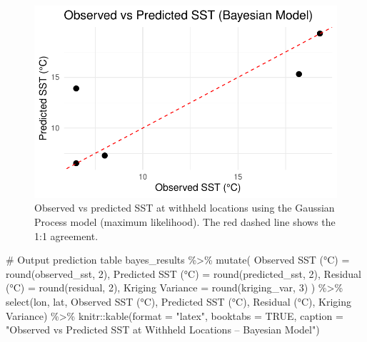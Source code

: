 \documentclass[
  11pt,
]{article}
\newenvironment{Shaded}{\begin{snugshade}}{\end{snugshade}}
\newcommand{\AttributeTok}[1]{\textcolor[rgb]{0.40,0.45,0.13}{#1}}
\newcommand{\CommentTok}[1]{\textcolor[rgb]{0.37,0.37,0.37}{#1}}
\newcommand{\ConstantTok}[1]{\textcolor[rgb]{0.56,0.35,0.01}{#1}}
\newcommand{\DecValTok}[1]{\textcolor[rgb]{0.68,0.00,0.00}{#1}}
\newcommand{\FunctionTok}[1]{\textcolor[rgb]{0.28,0.35,0.67}{#1}}
\newcommand{\NormalTok}[1]{\textcolor[rgb]{0.00,0.23,0.31}{#1}}
\newcommand{\OtherTok}[1]{\textcolor[rgb]{0.00,0.23,0.31}{#1}}
\newcommand{\SpecialCharTok}[1]{\textcolor[rgb]{0.37,0.37,0.37}{#1}}
\newcommand{\StringTok}[1]{\textcolor[rgb]{0.13,0.47,0.30}{#1}}
\begin{document}
\begin{figure}[H]

{\centering \includegraphics{project_files/figure-pdf/fig-bayes_pred_scatter-1.pdf}

}

\caption{Observed vs predicted SST at withheld locations using the
Gaussian Process model (maximum likelihood). The red dashed line shows
the 1:1 agreement.}

\end{figure}%

\begin{Shaded}
\begin{Highlighting}[]
\CommentTok{\# Output prediction table}
\NormalTok{bayes\_results }\SpecialCharTok{\%\textgreater{}\%}
  \FunctionTok{mutate}\NormalTok{(}
    \StringTok{\textasciigrave{}}\AttributeTok{Observed SST (°C)}\StringTok{\textasciigrave{}} \OtherTok{=} \FunctionTok{round}\NormalTok{(observed\_sst, }\DecValTok{2}\NormalTok{),}
    \StringTok{\textasciigrave{}}\AttributeTok{Predicted SST (°C)}\StringTok{\textasciigrave{}} \OtherTok{=} \FunctionTok{round}\NormalTok{(predicted\_sst, }\DecValTok{2}\NormalTok{),}
    \StringTok{\textasciigrave{}}\AttributeTok{Residual (°C)}\StringTok{\textasciigrave{}} \OtherTok{=} \FunctionTok{round}\NormalTok{(residual, }\DecValTok{2}\NormalTok{),}
    \StringTok{\textasciigrave{}}\AttributeTok{Kriging Variance}\StringTok{\textasciigrave{}} \OtherTok{=} \FunctionTok{round}\NormalTok{(kriging\_var, }\DecValTok{3}\NormalTok{)}
\NormalTok{  ) }\SpecialCharTok{\%\textgreater{}\%}
  \FunctionTok{select}\NormalTok{(lon, lat, }\StringTok{\textasciigrave{}}\AttributeTok{Observed SST (°C)}\StringTok{\textasciigrave{}}\NormalTok{, }\StringTok{\textasciigrave{}}\AttributeTok{Predicted SST (°C)}\StringTok{\textasciigrave{}}\NormalTok{, }\StringTok{\textasciigrave{}}\AttributeTok{Residual (°C)}\StringTok{\textasciigrave{}}\NormalTok{, }\StringTok{\textasciigrave{}}\AttributeTok{Kriging Variance}\StringTok{\textasciigrave{}}\NormalTok{) }\SpecialCharTok{\%\textgreater{}\%}
\NormalTok{  knitr}\SpecialCharTok{::}\FunctionTok{kable}\NormalTok{(}\AttributeTok{format =} \StringTok{"latex"}\NormalTok{, }\AttributeTok{booktabs =} \ConstantTok{TRUE}\NormalTok{,}
               \AttributeTok{caption =} \StringTok{"Observed vs Predicted SST at Withheld Locations – Bayesian Model"}\NormalTok{)}
\end{Highlighting}
\end{Shaded}
\end{document}
